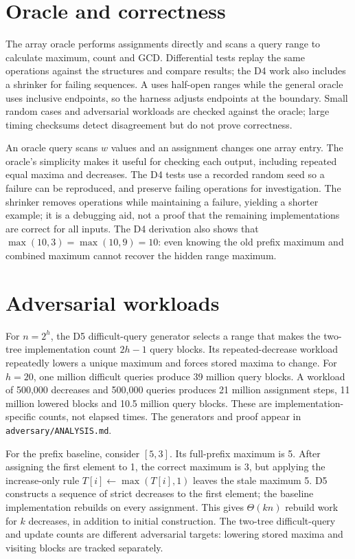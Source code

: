 \documentclass[11pt,a4paper]{article}
\begin{document}
\section{Oracle and correctness}
The array oracle performs assignments directly and scans a query range to calculate maximum, count and GCD. Differential tests replay the same operations against the structures and compare results; the D4 work also includes a shrinker for failing sequences. A uses half-open ranges while the general oracle uses inclusive endpoints, so the harness adjusts endpoints at the boundary. Small random cases and adversarial workloads are checked against the oracle; large timing checksums detect disagreement but do not prove correctness.

An oracle query scans $w$ values and an assignment changes one array entry. The oracle's simplicity makes it useful for checking each output, including repeated equal maxima and decreases. The D4 tests use a recorded random seed so a failure can be reproduced, and preserve failing operations for investigation. The shrinker removes operations while maintaining a failure, yielding a shorter example; it is a debugging aid, not a proof that the remaining implementations are correct for all inputs. The D4 derivation also shows that $\max(10,3)=\max(10,9)=10$: even knowing the old prefix maximum and combined maximum cannot recover the hidden range maximum.
\section{Adversarial workloads}
For $n=2^h$, the D5 difficult-query generator selects a range that makes the two-tree implementation count $2h-1$ query blocks. Its repeated-decrease workload repeatedly lowers a unique maximum and forces stored maxima to change. For $h=20$, one million difficult queries produce 39 million query blocks. A workload of 500,000 decreases and 500,000 queries produces 21 million assignment steps, 11 million lowered blocks and 10.5 million query blocks. These are implementation-specific counts, not elapsed times. The generators and proof appear in \texttt{adversary/ANALYSIS.md}.

For the prefix baseline, consider $[5,3]$. Its full-prefix maximum is 5. After assigning the first element to 1, the correct maximum is 3, but applying the increase-only rule $T[i]\leftarrow\max(T[i],1)$ leaves the stale maximum 5. D5 constructs a sequence of strict decreases to the first element; the baseline implementation rebuilds on every assignment. This gives $\Theta(kn)$ rebuild work for $k$ decreases, in addition to initial construction. The two-tree difficult-query and update counts are different adversarial targets: lowering stored maxima and visiting blocks are tracked separately.
\end{document}
